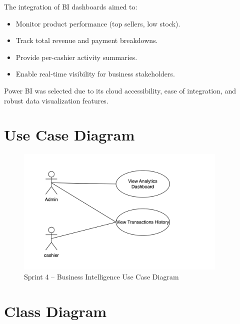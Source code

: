 The integration of BI dashboards aimed to:

\begin{itemize}
  \item Monitor product performance (top sellers, low stock).
  \item Track total revenue and payment breakdowns.
  \item Provide per-cashier activity summaries.
  \item Enable real-time visibility for business stakeholders.
\end{itemize}

Power BI was selected due to its cloud accessibility, ease of integration, and robust data visualization features.

\section{Use Case Diagram}

\begin{figure}[H]
  \centering
  \includegraphics[width=0.9\textwidth]{figures/images/sprint4usecase.png}
  \caption{Sprint 4 – Business Intelligence Use Case Diagram}
  \label{fig:sprint4-usecase}
\end{figure}

\section{Class Diagram}

